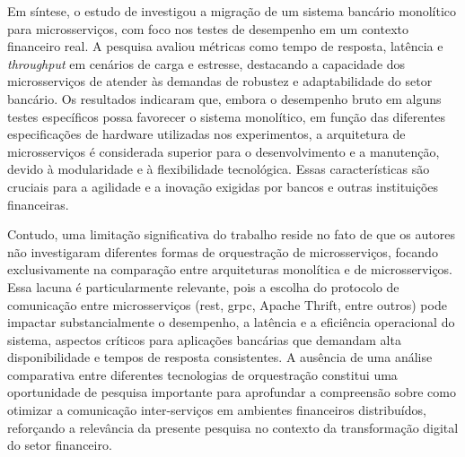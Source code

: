 Em síntese, o estudo de \textcite{maulana_design_2022} investigou a migração de um sistema bancário monolítico para microsserviços, com foco nos testes de desempenho em um contexto financeiro real. A pesquisa avaliou métricas como tempo de resposta, latência e \textit{throughput} em cenários de carga e estresse, destacando a capacidade dos microsserviços de atender às demandas de robustez e adaptabilidade do setor bancário. Os resultados indicaram que, embora o desempenho bruto em alguns testes específicos possa favorecer o sistema monolítico, em função das diferentes especificações de hardware utilizadas nos experimentos, a arquitetura de microsserviços é considerada superior para o desenvolvimento e a manutenção, devido à modularidade e à flexibilidade tecnológica. Essas características são cruciais para a agilidade e a inovação exigidas por bancos e outras instituições financeiras.

Contudo, uma limitação significativa do trabalho reside no fato de que os autores não investigaram diferentes formas de orquestração de microsserviços, focando exclusivamente na comparação entre arquiteturas monolítica e de microsserviços. Essa lacuna é particularmente relevante, pois a escolha do protocolo de comunicação entre microsserviços (\gls{rest}, \gls{grpc}, Apache Thrift, entre outros) pode impactar substancialmente o desempenho, a latência e a eficiência operacional do sistema, aspectos críticos para aplicações bancárias que demandam alta disponibilidade e tempos de resposta consistentes. A ausência de uma análise comparativa entre diferentes tecnologias de orquestração constitui uma oportunidade de pesquisa importante para aprofundar a compreensão sobre como otimizar a comunicação inter-serviços em ambientes financeiros distribuídos, reforçando a relevância da presente pesquisa no contexto da transformação digital do setor financeiro.
